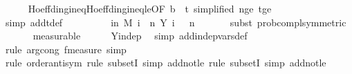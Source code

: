 \begin{isabellebody}
\ \ \ \ \isamarkupfalse%
\ Hoeffding{\isacharunderscore}{\kern0pt}ineq{\isachardot}{\kern0pt}Hoeffding{\isacharunderscore}{\kern0pt}ineq{\isacharunderscore}{\kern0pt}le{\isacharbrackleft}{\kern0pt}OF\ b{\isacharcomma}{\kern0pt}\ \ {\isasymepsilon}{\isacharequal}{\kern0pt}{\isachardoublequoteopen}t{\isachardoublequoteclose}{\isacharcomma}{\kern0pt}\ simplified{\isacharbrackright}{\kern0pt}\ n{\isacharunderscore}{\kern0pt}ge{\isacharunderscore}{\kern0pt}{}\ t{\isacharunderscore}{\kern0pt}ge{\isacharunderscore}{\kern0pt}{}\isanewline
\ \ \ \ \isamarkupfalse%
\ {\isacharparenleft}{\kern0pt}simp\ add{\isacharcolon}{\kern0pt}t{\isacharunderscore}{\kern0pt}def{\isacharparenright}{\kern0pt}\ \isanewline
\ \ \isamarkupfalse%
\ \isamarkupfalse%
\ {\isachardoublequoteopen}{\isachardot}{\kern0pt}{\isachardot}{\kern0pt}{\isachardot}{\kern0pt}\ {\isacharequal}{\kern0pt}\ {\isasymP}{\isacharparenleft}{\kern0pt}{\isasymomega}\ in\ M{\isachardot}{\kern0pt}\ {\isacharparenleft}{\kern0pt}{\isasymSum}i\ {\isacharequal}{\kern0pt}\ {}{\isachardot}{\kern0pt}{\isachardot}{\kern0pt}{\isacharless}{\kern0pt}n{\isachardot}{\kern0pt}\ Y\ i\ {\isasymomega}{\isacharparenright}{\kern0pt}\ {\isachargreater}{\kern0pt}\ n{\isacharslash}{\kern0pt}{}{\isacharparenright}{\kern0pt}{\isachardoublequoteclose}\ \isanewline
\ \ \ \ \isamarkupfalse%
\ {\isacharparenleft}{\kern0pt}subst\ prob{\isacharunderscore}{\kern0pt}compl{\isacharbrackleft}{\kern0pt}symmetric{\isacharbrackright}{\kern0pt}{\isacharparenright}{\kern0pt}\isanewline
\ \ \ \ \ \isamarkupfalse%
\ measurable\isanewline
\ \ \ \ \isamarkupfalse%
\ Y{\isacharunderscore}{\kern0pt}indep\ \isamarkupfalse%
\ {\isacharparenleft}{\kern0pt}simp\ add{\isacharcolon}{\kern0pt}indep{\isacharunderscore}{\kern0pt}vars{\isacharunderscore}{\kern0pt}def{\isacharparenright}{\kern0pt}\isanewline
\ \ \ \ \isamarkupfalse%
\ {\isacharparenleft}{\kern0pt}rule\ arg{\isacharunderscore}{\kern0pt}cong{}{\isacharbrackleft}{\kern0pt}\ f{\isacharequal}{\kern0pt}{\isachardoublequoteopen}measure{\isachardoublequoteclose}{\isacharbrackright}{\kern0pt}{\isacharcomma}{\kern0pt}\ simp{\isacharparenright}{\kern0pt}\isanewline
\ \ \ \ \isamarkupfalse%
\ {\isacharparenleft}{\kern0pt}rule\ order{\isacharunderscore}{\kern0pt}antisym{\isacharcomma}{\kern0pt}\ rule\ subsetI{\isacharcomma}{\kern0pt}\ simp\ add{\isacharcolon}{\kern0pt}not{\isacharunderscore}{\kern0pt}le{\isacharcomma}{\kern0pt}\ rule\ subsetI{\isacharcomma}{\kern0pt}\ simp\ add{\isacharcolon}{\kern0pt}not{\isacharunderscore}{\kern0pt}le{\isacharparenright}{\kern0pt}\isanewline

\end{isabellebody}
